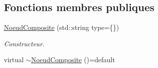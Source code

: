 \subsection*{Fonctions membres publiques}
\begin{DoxyCompactItemize}
\item 
\hypertarget{group__inf2990_ga9493824e1865121cb75097a28132573b}{\hyperlink{group__inf2990_ga9493824e1865121cb75097a28132573b}{Noeud\-Composite} (std\-::string type=\{\})}\label{group__inf2990_ga9493824e1865121cb75097a28132573b}

\begin{DoxyCompactList}\small\item\em Constructeur. \end{DoxyCompactList}\item 
\hypertarget{class_noeud_composite_af221c032fbc9d58e3344ee1b122095cd}{virtual \hyperlink{class_noeud_composite_af221c032fbc9d58e3344ee1b122095cd}{$\sim$\-Noeud\-Composite} ()=default}\label{class_noeud_composite_af221c032fbc9d58e3344ee1b122095cd}


\end{DoxyCompactItemize}
